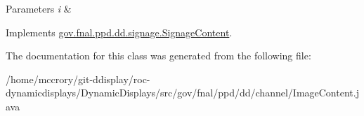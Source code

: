 \begin{DoxyParams}{Parameters}
{\em i} & \\
\hline
\end{DoxyParams}


Implements \hyperlink{interfacegov_1_1fnal_1_1ppd_1_1dd_1_1signage_1_1SignageContent_a59c75e24dcec3ea729297104328a7852}{gov.\-fnal.\-ppd.\-dd.\-signage.\-Signage\-Content}.



The documentation for this class was generated from the following file\-:\begin{DoxyCompactItemize}
\item 
/home/mccrory/git-\/ddisplay/roc-\/dynamicdisplays/\-Dynamic\-Displays/src/gov/fnal/ppd/dd/channel/Image\-Content.\-java\end{DoxyCompactItemize}
